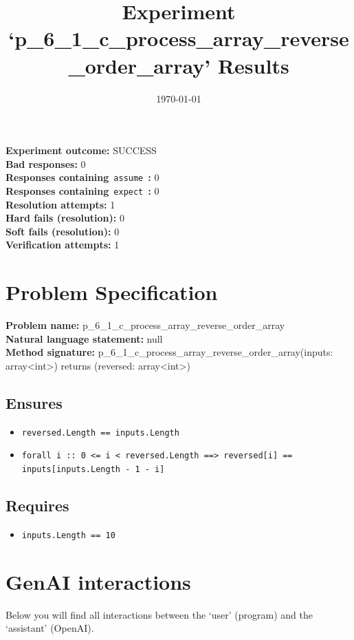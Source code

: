 \documentclass{article}
\begin{document}
\title{Experiment `p\_6\_1\_c\_process\_array\_reverse\_order\_array' Results}
\author{\today}
\date{}
\maketitle
\textbf{Experiment outcome: }SUCCESS
\\\textbf{Bad responses: }0
\\\textbf{Responses containing}~\texttt{assume}~\textbf{: }0
\\\textbf{Responses containing}~\texttt{expect}~\textbf{: }0
\\\textbf{Resolution attempts: }1
\\\textbf{Hard fails (resolution): }0
\\\textbf{Soft fails (resolution): }0
\\\textbf{Verification attempts: }1
\section*{Problem Specification}
\textbf{Problem name: }p\_6\_1\_c\_process\_array\_reverse\_order\_array
\\\textbf{Natural language statement: }null
\\\textbf{Method signature: }p\_6\_1\_c\_process\_array\_reverse\_order\_array(inputs: array<int>) returns (reversed: array<int>)
\subsection*{Ensures}
\begin{itemize}
\item \texttt{reversed.Length == inputs.Length}
\item \texttt{forall i :: 0 <= i < reversed.Length ==> reversed[i] == inputs[inputs.Length - 1 - i]}
\end{itemize}
\subsection*{Requires}
\begin{itemize}
\item \texttt{inputs.Length == 10}
\end{itemize}
\clearpage
\section*{GenAI interactions}
Below you will find all interactions between the `user' (program) and the `assistant' (OpenAI).
\end{document}
